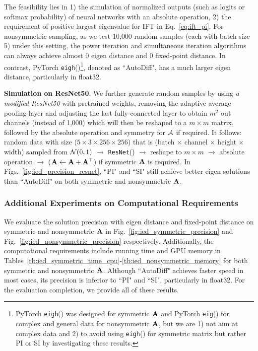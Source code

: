 The feasibility lies in 1) the simulation of normalized outputs (such as logits or softmax probability) of neural networks with an absolute operation,
2) the requirement of positive largest eigenvalue for IFT in Eq.~\eqref{eq:ift_pi}.
For nonsymmetric sampling, as we test 10,000 random samples (each with batch size 5) under this setting,
the power iteration and simultaneous iteration algorithms can always achieve almost 0 eigen distance and 0 fixed-point distance.
In contrast, PyTorch \texttt{eigh}()\footnote{PyTorch \texttt{eigh}() was designed for symmetric $\mathbf{A}$ and PyTorch \texttt{eig}() for complex and general data for nonsymmetric $\mathbf{A}$, but we are 1) not aim at complex data and 2) to avoid using \texttt{eigh}() for symmetric matrix but rather PI or SI by investigating these results.}, denoted as ``AutoDiff", has a much larger eigen distance, particularly in float32.

\textbf{Simulation on ResNet50}. We further generate random samples by using \textit{a modified ResNet50} with pretrained weights, removing the adaptive average pooling layer and adjusting the last fully-connected layer to obtain $m^2$ out channels (instead of 1,000) which will then be reshaped to a $m \times m$ matrix, followed by the absolute operation and symmetry for $\mathcal{A}$ if required.
It follows: random data with size ($5 \times 3 \times 256 \times 256$) that is (batch $\times$ channel $\times$ height $\times$ width) sampled from $\mathcal{N}(0, 1)$ $\rightarrow$ \texttt{ResNet}() $\rightarrow$ reshape to $m \times m$ $\rightarrow$ absolute operation $\rightarrow$ ($\mathbf{A} \leftarrow \mathbf{A} + \mathbf{A}^\top$) if symmetric $\mathbf{A}$ is required.
In Figs.~\ref{fig:ied_precision_resnet}, ``PI" and ``SI" still achieve better eigen solutions than ``AutoDiff" on both symmetric and nonsymmetric $\mathbf{A}$.

\subsubsection{Additional Experiments on Computational Requirements}
We evaluate the solution precision with eigen distance and fixed-point distance on symmetric and nonsymmetric $\mathbf{A}$ in Fig.~\ref{fig:ied_symmetric_precision} and Fig.~\ref{fig:ied_nonsymmetric_precision} respectively.
Additionally, the computational requirements include running time and GPU memory in Tables~\ref{tb:ied_symmetric_time_cpu}-\ref{tb:ied_nonsymmetric_memory} for both symmetric and nonsymmetric $\mathbf{A}$.
Although ``AutoDiff" achieves faster speed in most cases, its precision is inferior to ``PI" and ``SI", particularly in float32.
For the evaluation completion, we provide all of these results.

